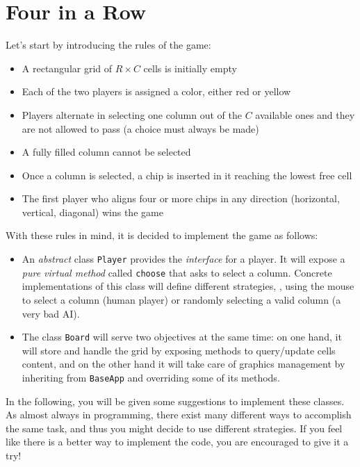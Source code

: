 \documentclass{article}
\begin{document}
\section{Four in a Row}

Let's start by introducing the rules of the game:
\begin{itemize}
  \item A rectangular grid of $R\times C$ cells is initially empty
  \item Each of the two players is assigned a color, either red or yellow
  \item Players alternate in selecting one column out of the $C$ available ones and they are not allowed to pass (a choice must always be made)
  \item A fully filled column cannot be selected
  \item Once a column is selected, a chip is inserted in it reaching the lowest free cell
  \item The first player who aligns four or more chips in any direction (horizontal, vertical, diagonal) wins the game
\end{itemize}
With these rules in mind, it is decided to implement the game as follows:
\begin{itemize}
  \item An \emph{abstract} class \texttt{Player} provides the \emph{interface} for a player. It will expose a \emph{pure virtual method} called \texttt{choose} that asks to select a column. Concrete implementations of this class will define different strategies, \eg, using the mouse to select a column (human player) or randomly selecting a valid column (a very bad AI).
  \item The class \texttt{Board} will serve two objectives at the same time: on one hand, it will store and handle the grid by exposing methods to query/update cells content, and on the other hand it will take care of graphics management by inheriting from \texttt{BaseApp} and overriding some of its methods. 
\end{itemize}

In the following, you will be given some suggestions to implement these classes. As almost always in programming, there exist many different ways to accomplish the same task, and thus you might decide to use different strategies. If you feel like there is a better way to implement the code, you are encouraged to give it a try!
\end{document}
